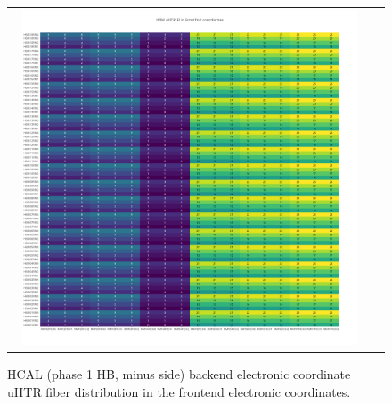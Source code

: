 \begin{figure}[htb]
 \begin{center}
  \begin{tabular}{cc}
   \includegraphics[angle=0,width=0.95\textwidth]{figures/appendix/HBM_uHTR_FI_in_FrontEnd.png}
  \end{tabular}
  \caption{HCAL (phase 1 HB, minus side) backend electronic coordinate uHTR fiber distribution in the frontend electronic coordinates.}
  \label{fig:lmapHBMuHTRFIFEC}
 \end{center}
\end{figure}

